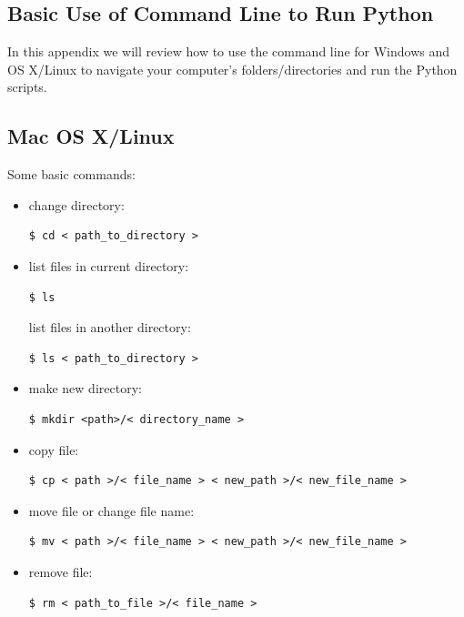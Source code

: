 \documentclass{SciPost}
\newcommand\0{\scalebox{-1}[1]{0}}
\let\svttfamily\ttfamily
\renewcommand\ttfamily{\svttfamily\catcode`0=\active }
\begin{document}
\begin{appendix}
	
	\section{Basic Use of Command Line to Run Python}
	\label{app:cmd_line}
	
	In this appendix we will review how to use the command line for Windows and OS X/Linux to navigate your computer's folders/directories and run the Python scripts.
	
	\subsection{Mac OS X/Linux}
	Some basic commands:
	
	\begin{itemize}
		\item change directory:
		\begin{lstlisting}[numbers=none,keywordstyle=\ttfamily]
		$ cd < path_to_directory >
		\end{lstlisting}
		\item list files in current directory:
		\begin{lstlisting}[numbers=none,keywordstyle=\ttfamily]
		$ ls 
		\end{lstlisting}
		list files in another directory:
		\begin{lstlisting}[numbers=none,keywordstyle=\ttfamily]
		$ ls < path_to_directory >
		\end{lstlisting}
		\item make new directory:
		\begin{lstlisting}[numbers=none,keywordstyle=\ttfamily]
		$ mkdir <path>/< directory_name >
		\end{lstlisting}
		\item copy file:
		\begin{lstlisting}[numbers=none,keywordstyle=\ttfamily]
		$ cp < path >/< file_name > < new_path >/< new_file_name >
		\end{lstlisting}
		\item move file or change file name:
		\begin{lstlisting}[numbers=none]
		$ mv < path >/< file_name > < new_path >/< new_file_name >
		\end{lstlisting}
		\item remove file:
		\begin{lstlisting}[numbers=none,keywordstyle=\ttfamily]
		$ rm < path_to_file >/< file_name >
		\end{lstlisting}
		

\end{itemize}
\end{appendix}
\end{document}
